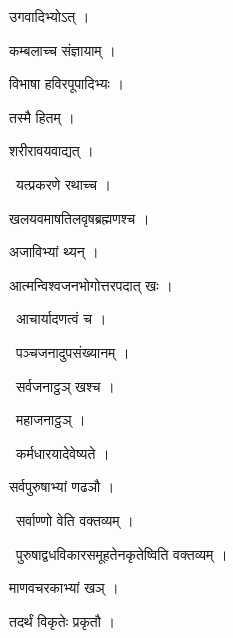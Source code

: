 \documentclass[10pt, openany, oneside]{book}
\begin{document}
\noindent उगवादिभ्योऽत् ।

\noindent कम्बलाच्च संज्ञायाम् ।

\noindent विभाषा हविरपूपादिभ्यः ।

\noindent तस्मै हितम् ।

\noindent शरीरावयवाद्यत् ।

\par\noindent\hspace{1.5em}{\vps वा॰}~{\qt यत्प्रकरणे रथाच्च ।}

\noindent खलयवमाषतिलवृषब्रह्मणश्च ।

\noindent अजाविभ्यां थ्यन् ।

\noindent आत्मन्विश्वजनभोगोत्तरपदात् खः ।

\par\noindent\hspace{1.5em}{\vps वा॰}~{\qt आचार्यादणत्वं च ।}

\par\noindent\hspace{1.5em}{\vps वा॰}~{\qt पञ्चजनादुपसंख्यानम् ।}

\par\noindent\hspace{1.5em}{\vps वा॰}~{\qt सर्वजनाट्ठञ् खश्च ।}

\par\noindent\hspace{1.5em}{\vps वा॰}~{\qt महाजनाट्ठञ् ।}

\par\noindent\hspace{1.5em}{\vps वा॰}~{\qt कर्मधारयादेवेष्यते ।}

\noindent सर्वपुरुषाभ्यां णढञौ ।

\par\noindent\hspace{1.5em}{\vps वा॰}~{\qt सर्वाण्णो वेति वक्तव्यम् ।}

\par\noindent\hspace{1.5em}{\vps वा॰}~{\qt पुरुषाद्वधविकारसमूहतेनकृतेष्विति वक्तव्यम्  ।}

\noindent माणवचरकाभ्यां खञ् ।

\noindent तदर्थं विकृतेः प्रकृतौ ।
\end{document}
